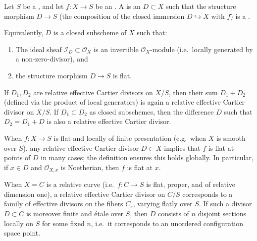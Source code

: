 \begin{definition} \label{definition:relative_effective_cartier_divisor_on_a_scheme_over_a_scheme}
Let $S$ be a , and let $f \colon X \to S$ be an . A  is an  $D \subset X$ such that the structure morphism $D \to S$ (the composition of the closed immersion $D \hookrightarrow X$ with $f$) is a .

Equivalently, $D$ is a closed subscheme of $X$ such that:
\begin{enumerate}
    \item The ideal sheaf $\mathcal{I}_D \subset \mathcal{O}_X$ is an invertible $\mathcal{O}_X$-module (i.e.\ locally generated by a non-zero-divisor), and
    \item the structure morphism $D \to S$ is flat.
\end{enumerate}

If $D_1, D_2$ are relative effective Cartier divisors on $X/S$, then their sum $D_1 + D_2$ (defined via the product of local generators) is again a relative effective Cartier divisor on $X/S$. If $D_1 \subset D_2$ as closed subschemes, then the difference $D$ such that $D_2 = D_1 + D$ is also a relative effective Cartier divisor.

When $f \colon X \to S$ is flat and locally of finite presentation (e.g.\ when $X$ is smooth over $S$), any relative effective Cartier divisor $D \subset X$ implies that $f$ is flat at points of $D$ in many cases; the definition ensures this holds globally. In particular, if $x \in D$ and $\mathcal{O}_{X,x}$ is Noetherian, then $f$ is flat at $x$.

When $X = C$ is a relative curve (i.e.\ $f \colon C \to S$ is flat, proper, and of relative dimension one), a relative effective Cartier divisor on $C/S$ corresponds to a family of effective divisors on the fibers $C_s$, varying flatly over $S$. If such a divisor $D \subset C$ is moreover finite and étale over $S$, then $D$ consists of $n$ disjoint sections locally on $S$ for some fixed $n$, i.e.\ it corresponds to an unordered configuration space point.
\end{definition}
